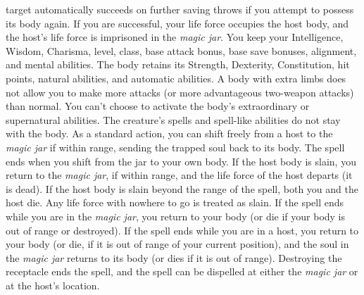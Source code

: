 target automatically succeeds on further saving throws if you attempt to possess
its body again.
If you are successful, your life force occupies the host body, and the host's life
force is imprisoned in the \textit{magic jar}. You keep your Intelligence, Wisdom,
Charisma, level, class, base attack bonus, base save bonuses, alignment, and mental
abilities. The body retains its Strength, Dexterity, Constitution, hit points,
natural abilities, and automatic abilities. A body with extra limbs does not allow
you to make more attacks (or more advantageous two-weapon attacks) than normal.
You can't choose to activate the body's extraordinary or supernatural abilities.
The creature's spells and spell-like abilities do not stay with the body.
As a standard action, you can shift freely from a host to the \textit{magic jar
}if within range, sending the trapped soul back to its body. The spell ends when
you shift from the jar to your own body.
If the host body is slain, you return to the \textit{magic jar}, if within range,
and the life force of the host departs (it is dead). If the host body is slain
beyond the range of the spell, both you and the host die. Any life force with nowhere
to go is treated as slain.
If the spell ends while you are in the \textit{magic jar}, you return to your body
(or die if your body is out of range or destroyed). If the spell ends while you
are in a host, you return to your body (or die, if it is out of range of your current
position), and the soul in the \textit{magic jar} returns to its body (or dies
if it is out of range). Destroying the receptacle ends the spell, and the spell
can be dispelled at either the \textit{magic jar} or at the host's location.